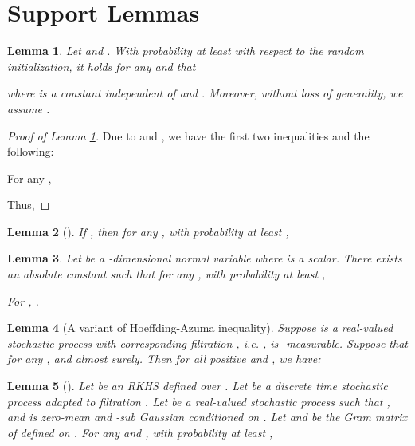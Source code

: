 \documentclass{article} \usepackage{iclr2023/iclr2023_conference,times}
\newtheorem{lemma}{Lemma}[section]
\begin{document}
 \section{Support Lemmas}
\begin{lemma}


Let  and . With probability at least  with respect to the random initialization, it holds for any  and  that

where  is a constant independent of  and . Moreover, without loss of generality, we assume .  
\label{lemma: NTK approximation error}
\end{lemma}
\begin{proof}[Proof of Lemma \ref{lemma: NTK approximation error}]
Due to \cite[Lemma~C.2]{yang2020function} and \cite[Lemma~F.1, F.2]{cai2019neural}, we have the first two inequalities and the following: 

For any , 

Thus, 

\end{proof}

\begin{lemma}[{\cite[Theorem~3]{arora2019exact}}]
\label{lemma: ntk gram matrix versus grad gram matrix}
If , then for any , with probability at least , 

\end{lemma}


\begin{lemma}
Let  be a -dimensional normal variable where  is a scalar. There exists an absolute constant  such that for any , with probability at least , 

For , . 

\label{lemma: Concentration of multivariate Gaussian}
\end{lemma}

\begin{lemma}[A variant of Hoeffding-Azuma inequality]
Suppose  is a real-valued stochastic process with corresponding filtration , i.e. ,  is -measurable. Suppose that for any ,  and  almost surely. Then for all positive  and , we have: 

\label{lemma:azuma}
\end{lemma}

\begin{lemma}[{\citep[Theorem~1]{chowdhury2017kernelized}}]
Let  be an RKHS defined over . Let  be a discrete time stochastic process adapted to filtration . Let  be a real-valued stochastic process such that , and  is zero-mean and -sub Gaussian conditioned on . Let  and  be the Gram matrix of  defined on . For any  and , with probability at least , 

\label{lemma: self-normalized concentration process in RKHS}
\end{lemma}
\end{document}
